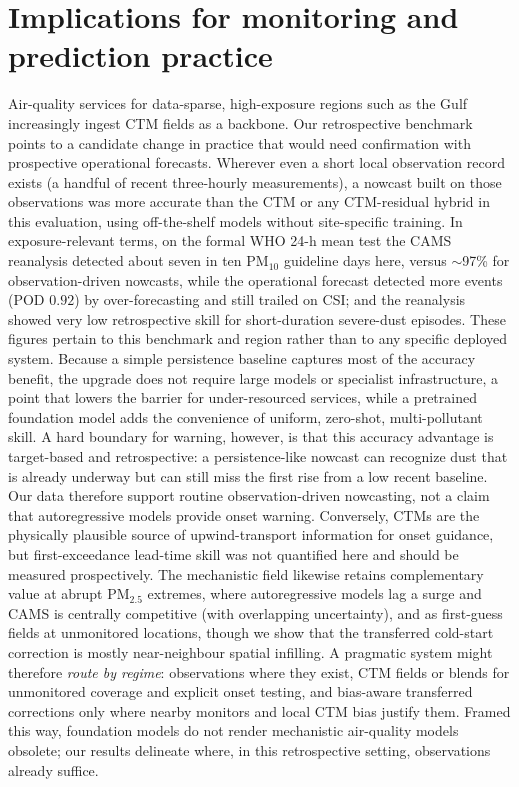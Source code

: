 \documentclass[review,times,authoryear]{elsarticle}
\newcommand*{\pmtf}{\ensuremath{\mathrm{PM_{2.5}}}}
\newcommand*{\pmten}{\ensuremath{\mathrm{PM_{10}}}}
\begin{document}
\section{Implications for monitoring and prediction practice}\label{sec:implications}
Air-quality services for data-sparse, high-exposure regions such as the Gulf increasingly ingest CTM fields as a backbone. Our retrospective benchmark points to a candidate change in practice that would need confirmation with prospective operational forecasts. Wherever even a short local observation record exists (a handful of recent three-hourly measurements), a nowcast built on those observations was more accurate than the CTM or any CTM-residual hybrid in this evaluation, using off-the-shelf models without site-specific training. In exposure-relevant terms, on the formal WHO 24-h mean test the CAMS reanalysis detected about seven in ten \pmten{} guideline days here, versus $\sim$97\% for observation-driven nowcasts, while the operational forecast detected more events (POD $0.92$) by over-forecasting and still trailed on CSI; and the reanalysis showed very low retrospective skill for short-duration severe-dust episodes. These figures pertain to this benchmark and region rather than to any specific deployed system. Because a simple persistence baseline captures most of the accuracy benefit, the upgrade does not require large models or specialist infrastructure, a point that lowers the barrier for under-resourced services, while a pretrained foundation model adds the convenience of uniform, zero-shot, multi-pollutant skill. A hard boundary for warning, however, is that this accuracy advantage is target-based and retrospective: a persistence-like nowcast can recognize dust that is already underway but can still miss the first rise from a low recent baseline. Our data therefore support routine observation-driven nowcasting, not a claim that autoregressive models provide onset warning. Conversely, CTMs are the physically plausible source of upwind-transport information for onset guidance, but first-exceedance lead-time skill was not quantified here and should be measured prospectively. The mechanistic field likewise retains complementary value at abrupt \pmtf{} extremes, where autoregressive models lag a surge and CAMS is centrally competitive (with overlapping uncertainty), and as first-guess fields at unmonitored locations, though we show that the transferred cold-start correction is mostly near-neighbour spatial infilling. A pragmatic system might therefore \emph{route by regime}: observations where they exist, CTM fields or blends for unmonitored coverage and explicit onset testing, and bias-aware transferred corrections only where nearby monitors and local CTM bias justify them. Framed this way, foundation models do not render mechanistic air-quality models obsolete; our results delineate where, in this retrospective setting, observations already suffice.
\end{document}
